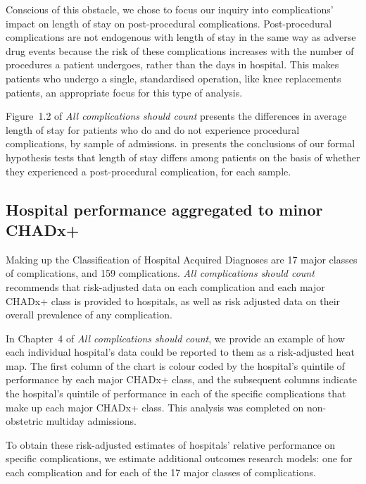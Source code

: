 \documentclass[submission]{grattan}
\newcommand*{\Figure}[1]{Figure~#1}
\newcommand*{\myTitle}{All complications should count}
\begin{document}
Conscious of this obstacle, we chose to focus our inquiry into complications' impact on length of stay on post-procedural complications.
Post-procedural complications are not endogenous with length of stay in the same way as adverse drug events because the risk of these complications increases with the number of procedures a patient undergoes, rather than the days in hospital.
This makes patients who undergo a single, standardised operation, like knee replacements patients, an appropriate focus for this type of analysis.

\Figure{1.2} of \textit{\myTitle} presents the differences in average length of stay for patients who do and do not experience procedural complications, by sample of admissions.  in  presents the conclusions of our formal hypothesis tests that length of stay differs among patients on the basis of whether they experienced a post-procedural complication, for each sample.



\subsection{Hospital performance aggregated to minor CHADx+}\label{subsec:hospital-performance-aggregated-to-minor-chadx}

Making up the Classification of Hospital Acquired Diagnoses are 17 major classes of complications, and 159 complications. \textit{\myTitle} recommends that risk-adjusted data on each complication and each major CHADx+ class is provided to hospitals, as well as risk adjusted data on their overall prevalence of any complication.

In Chapter~4 of \textit{\myTitle}, we provide an example of how each individual hospital's data could be reported to them as a risk-adjusted heat map.
The first column of the chart is colour coded by the hospital's quintile of performance by each major CHADx+ class, and the subsequent columns indicate the hospital's quintile of performance in each of the specific complications that make up each major CHADx+ class.
This analysis was completed on non-obstetric multiday admissions.

To obtain these risk-adjusted estimates of hospitals' relative performance on specific complications, we estimate additional outcomes research models: one for each complication and for each of the 17 major classes of complications.
\end{document}
